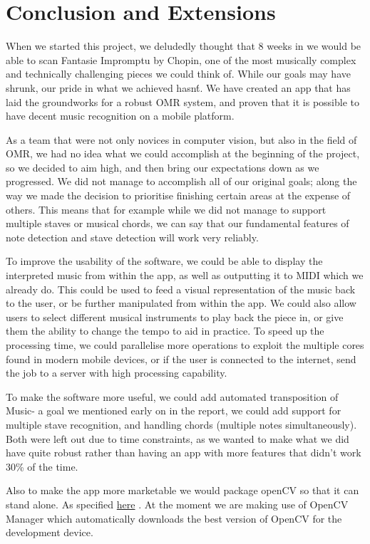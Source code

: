 \section{Conclusion and Extensions}

When we started this project, we deludedly thought that 8 weeks in we would be able to scan Fantasie Impromptu by Chopin, one of the most musically complex and technically challenging pieces we could think of. While our goals may have shrunk, our pride in what we achieved hasn\'t. We have created an app that has laid the groundworks for a robust OMR system, and proven that it is possible to have decent music recognition on a mobile platform. 

As a team that were not only novices in computer vision, but also in the field of OMR, we had no idea what we could accomplish at the beginning of the project, so we decided to aim high, and then bring our expectations down as we progressed. We did not manage to accomplish all of our original goals; along the way we made the decision to prioritise finishing certain areas at the expense of others. This means that for example while we did not manage to support multiple staves or musical chords, we can say that our fundamental features of note detection and stave detection will work very reliably.
 
To improve the usability of the software, we could be able to display the interpreted music from within the app, as well as outputting it to MIDI which we already do. This could be used to feed a visual representation of the music back to the user, or be further manipulated from within the app. We could also allow users to select different musical instruments to play back the piece in, or give them the ability to change the tempo to aid in practice. To speed up the processing time, we could parallelise more operations to exploit the multiple cores found in modern mobile devices, or if the user is connected to the internet, send the job to a server with high processing capability.
 
To make the software more useful, we could add automated transposition of Music- a goal we mentioned early on in the report, we could add support for multiple stave recognition, and handling chords (multiple notes simultaneously). Both were left out due to time constraints, as we wanted to make what we did have quite robust rather than having an app with more features that didn't work 30\% of the time.

Also to make the app more marketable we would package openCV so that it can stand alone. As specified \href{http://docs.opencv.org/doc/tutorials/introduction/android_binary_package/dev_with_OCV_on_Android.html}{here} .
At the moment we are making use of OpenCV Manager which automatically downloads the best version of OpenCV for the development device.


